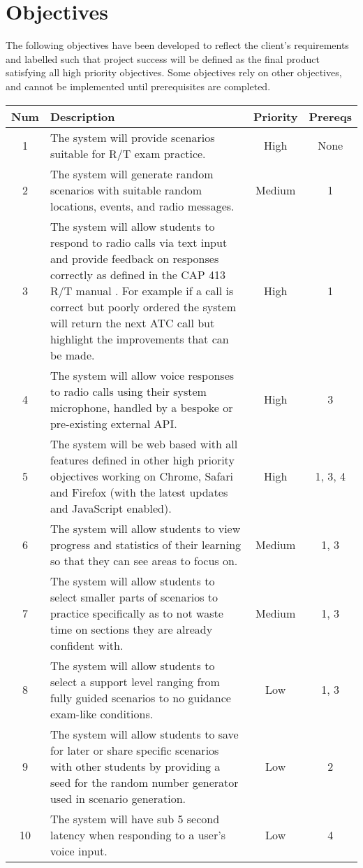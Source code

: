\section{Objectives}
The following objectives have been developed to reflect the client's requirements and labelled such that project success will be defined as the final product satisfying all high priority objectives. Some objectives rely on other objectives, and cannot be implemented until prerequisites are completed.

\begin{center}
    \begin{tabular}{ | c | m{20em} | c | c | }
        \hline
        \bf{Num} & \bf{Description} & \bf{Priority} & \bf{Prereqs} \\
        \hline
        1 & The system will provide scenarios suitable for R/T exam practice. & High & None \\
        \hline
        2 & The system will generate random scenarios with suitable random locations, events, and radio messages. & Medium & 1 \\
        \hline
        3 & The system will allow students to respond to radio calls via text input and provide feedback on responses correctly as defined in the CAP 413 R/T manual \cite{CAP413}. For example if a call is correct but poorly ordered the system will return the next ATC call but highlight the improvements that can be made. & High & 1 \\
        \hline
        4 & The system will allow voice responses to radio calls using their system microphone, handled by a bespoke or pre-existing external API. & High & 3 \\
        \hline
        5 & The system will be web based with all features defined in other high priority objectives working on Chrome, Safari and Firefox (with the latest updates and JavaScript enabled). & High & 1, 3, 4 \\
        \hline
        6 & The system will allow students to view progress and statistics of their learning so that they can see areas to focus on. & Medium & 1, 3 \\
        \hline
        7 & The system will allow students to select smaller parts of scenarios to practice specifically as to not waste time on sections they are already confident with. & Medium & 1, 3 \\
        \hline
        8 & The system will allow students to select a support level ranging from fully guided scenarios to no guidance exam-like conditions. & Low & 1, 3 \\
        \hline
        9 & The system will allow students to save for later or share specific scenarios with other students by providing a seed for the random number generator used in scenario generation. & Low & 2 \\
        \hline
        10 & The system will have sub 5 second latency when responding to a user's voice input. & Low & 4 \\
        \hline
    \end{tabular}
\end{center}